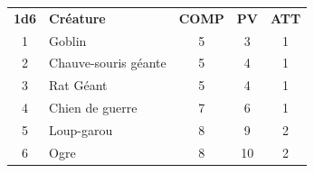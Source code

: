 \begin{frame}[b]
{\begin{minipage}[c][0.95\textheight][c]{\linewidth}
\begin{center}
\begin{tabular}{clccc}
\textbf{1d6} &  \textbf{Créature} &  \textbf{COMP} &  \textbf{PV} &  \textbf{ATT} \\
    1 &  Goblin               &       5 &     3 &      1 \\
    2 &  Chauve-souris géante &       5 &     4 &      1 \\
    3 &  Rat Géant            &       5 &     4 &      1 \\
    4 &  Chien de guerre      &       7 &     6 &      1 \\
    5 &  Loup-garou           &       8 &     9 &      2 \\
    6 &  Ogre                 &       8 &    10 &      2 \\
\end{tabular}
\end{center}

\end{minipage}
}
\end{frame}

